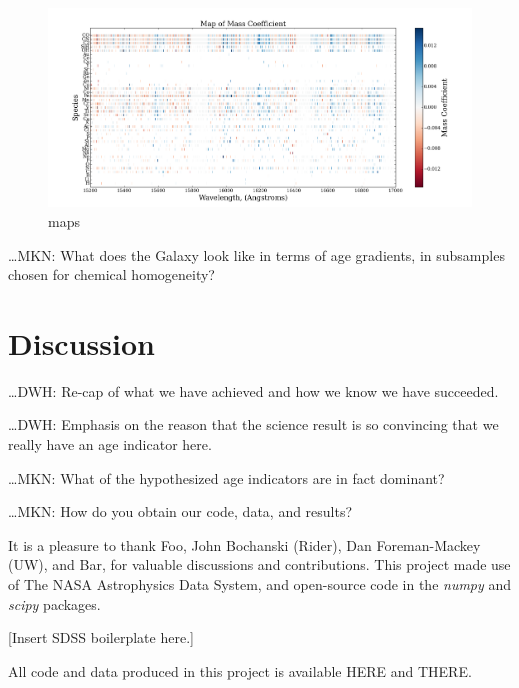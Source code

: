 \documentclass[12pt, preprint]{aastex}
\newcommand{\project}[1]{\textsl{#1}}
\begin{document}
\begin{figure}[h!]
  \includegraphics[scale=0.21]{./plots/mass_coefficient.png}
  \caption{maps} 
\label{fig:maps}
\end{figure}

\ldots MKN: What does the Galaxy look like in terms of age gradients,
in subsamples chosen for chemical homogeneity?

\section{Discussion}

\ldots DWH: Re-cap of what we have achieved and how we know we have
succeeded.

\ldots DWH: Emphasis on the reason that the science result is so
convincing that we really have an age indicator here.

\ldots MKN: What of the hypothesized age indicators are in fact
dominant?

\ldots MKN: How do you obtain our code, data, and results?

\acknowledgments
It is a pleasure to thank
  Foo,
  John Bochanski (Rider),
  Dan Foreman-Mackey (UW), and
  Bar,
for valuable discussions and contributions.
This project made use of
  The NASA Astrophysics Data System,
  and open-source code in the \project{numpy} and \project{scipy} packages.

[Insert SDSS boilerplate here.]

All code and data produced in this project is available HERE and THERE.
\end{document}
